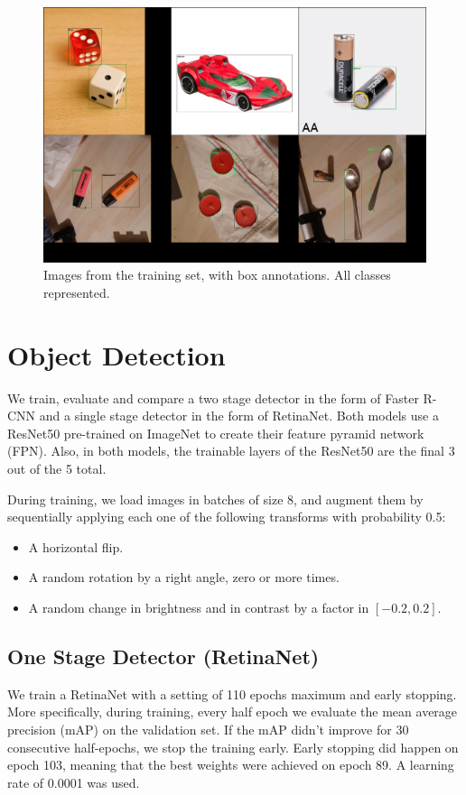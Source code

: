 \documentclass{article}
\begin{document}
\begin{figure}[h]
    \centering
    \includegraphics[width=\textwidth]{one_of_each.png}
    \caption{Images from the training set, with box annotations. All classes represented.}
    \label{fig:one_of_each}
\end{figure}

\section{Object Detection}

We train, evaluate and compare a two stage detector in the form of Faster R-CNN and a single stage detector in the form of RetinaNet. Both models use a ResNet50 pre-trained on ImageNet to create their feature pyramid network (FPN). Also, in both models, the trainable layers of the ResNet50 are the final 3 out of the 5 total.

During training, we load images in batches of size 8, and augment them by sequentially applying each one of the following transforms with probability 0.5:
\begin{itemize}
    \item A horizontal flip.
    \item A random rotation by a right angle, zero or more times.
    \item A random change in brightness and in contrast by a factor in \([-0.2, 0.2]\).
\end{itemize}

\subsection{One Stage Detector (RetinaNet)}
We train a RetinaNet \cite{retinanet} with a setting of 110 epochs maximum and early stopping. More specifically, during training, every half epoch we evaluate the mean average precision (mAP) on the validation set. If the mAP didn’t improve for 30 consecutive half-epochs, we stop the training early. Early stopping did happen on epoch 103, meaning that the best weights were achieved on epoch 89. A learning rate of 0.0001 was used.
\end{document}
